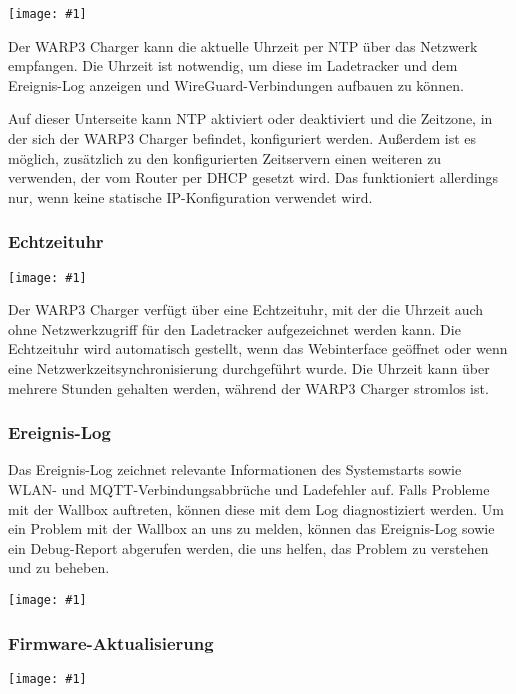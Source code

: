 \documentclass[a4paper,10pt]{article}
\newcommand{\gfx}[1]{\texttt{[image: \#1]}}
\begin{document}
\begin{multicols*}{2}
    \gfx{./img_warp3/resized/web_ntp}

    Der WARP3 Charger kann die aktuelle Uhrzeit per NTP über das Netzwerk empfangen.
    Die Uhrzeit ist notwendig, um diese im Ladetracker und dem Ereignis-Log anzeigen und
    WireGuard-Verbindungen aufbauen zu können.

    Auf dieser Unterseite kann NTP aktiviert oder deaktiviert und die Zeitzone, in der sich
    der WARP3 Charger befindet, konfiguriert werden. Außerdem ist es möglich, zusätzlich zu den konfigurierten Zeitservern einen weiteren zu verwenden, der vom Router per DHCP gesetzt wird. Das funktioniert allerdings nur, wenn keine statische IP-Konfiguration verwendet wird.

    \vspace{-0.2cm}
    \subsubsection{Echtzeituhr}

    \gfx{./img_warp3/resized/web_rtc}

    Der WARP3 Charger verfügt über eine Echtzeituhr, mit der die Uhrzeit auch ohne Netzwerkzugriff für den Ladetracker aufgezeichnet werden kann. Die Echtzeituhr wird automatisch gestellt, wenn das Webinterface geöffnet oder wenn eine Netzwerkzeitsynchronisierung durchgeführt wurde. Die Uhrzeit kann über mehrere Stunden gehalten werden, während der WARP3 Charger stromlos ist.


    \subsubsection{Ereignis-Log}

    Das Ereignis-Log zeichnet relevante Informationen des Systemstarts sowie WLAN- und MQTT-Ver\-bin\-dungs\-abbrüche und Ladefehler auf.
    Falls Probleme mit der Wallbox auftreten, können diese mit dem Log diagnostiziert werden.
    Um ein Problem mit der Wallbox an uns zu melden, können das Ereignis-Log
    sowie ein Debug-Report abgerufen werden, die uns helfen, das Problem zu verstehen und zu beheben.

    \gfx{./img_warp3/resized/web_event_log}

    \subsubsection{Firmware-Aktualisierung}\label{firmware-update}

    \gfx{./img_warp3/resized/web_firmware_update}


\end{multicols*}
\end{document}
